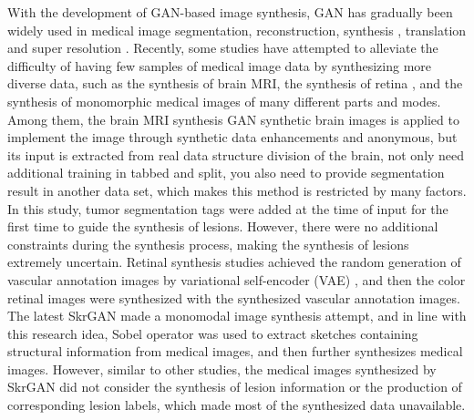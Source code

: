 \documentclass[runningheads]{llncs}
\begin{document}
With the development of GAN-based image synthesis, GAN has gradually been widely used in medical image segmentation\cite{40kamnitsas2017unsupervised}, reconstruction\cite{61fan2018a,65anirudh2018lose}, synthesis \cite{41costa2017towards,4shin2018medical,43iglesias2013is,44shrivastava2017learning}, translation \cite{2zhang2018translating,20nie2017medical,35osokin2017gans,36vannguyen2015crossdomain,40kamnitsas2017unsupervised,136yi2018sharpness-aware,137yang2018low-dose,138WolterinkGenerative} and super resolution \cite{14You2018CT,15lyu2018super-resolution}. 
Recently, some studies have attempted to alleviate the difficulty of having few samples of medical image data by synthesizing more diverse data, such as the synthesis of brain MRI\cite{4shin2018medical}, the synthesis of retina \cite{41costa2017towards}, and the synthesis of monomorphic medical images of many different parts and modes\cite{96zhang2019skrgan:}. Among them, the brain MRI synthesis \cite{4shin2018medical} GAN synthetic brain images is applied to implement the image through synthetic data enhancements and anonymous, but its input is extracted from real data structure division of the brain, not only need additional training in tabbed and split, you also need to provide segmentation result in another data set, which makes this method is restricted by many factors. In this study, tumor segmentation tags were added at the time of input for the first time to guide the synthesis of lesions. However, there were no additional constraints during the synthesis process, making the synthesis of lesions extremely uncertain. Retinal synthesis studies\cite{41costa2017towards} achieved the random generation of vascular annotation images by variational self-encoder (VAE) \cite{87kingma2014auto-encoding,88rezende2014stochastic}, and then the color retinal images were synthesized with the synthesized vascular annotation images. The latest SkrGAN\cite{96zhang2019skrgan:} made a monomodal image synthesis attempt, and in line with this research idea, Sobel operator was used to extract sketches containing structural information from medical images, and then further synthesizes medical images. However, similar to other studies, the medical images synthesized by SkrGAN did not consider the synthesis of lesion information or the production of corresponding lesion labels, which made most of the synthesized data unavailable.
\end{document}
